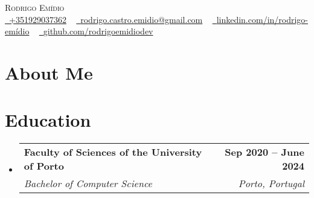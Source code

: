 \documentclass[letterpaper,11pt]{article}
\makeatletter
\newcommand{\resumeSubheading}[4]{
  \vspace{-2pt}\item
    \begin{tabular*}{1.0\textwidth}[t]{l@{\extracolsep{\fill}}r}
      \textbf{#1} & \textbf{\small #2} \\
      \textit{\small#3} & \textit{\small #4} \\
    \end{tabular*}\vspace{-7pt}
}
\newcommand{\resumeSubHeadingListStart}{\begin{itemize}[leftmargin=0.0in, label={}]}
\newcommand{\resumeSubHeadingListEnd}{\end{itemize}}
\makeatother
\begin{document}

\begin{center}
    {\Huge \scshape Rodrigo Emídio} \\ \vspace{5pt}
    \small \href{tel:+351929037362}{\raisebox{-0.1\height}\faPhone\ {+351929037362}} ~ \href{mailto:rodrigo.castro.emidio@gmail.com}{\raisebox{-0.2\height}\faEnvelope\ {rodrigo.castro.emidio@gmail.com}} ~ 
    \href{https://www.linkedin.com/in/rodrigo-emídio/}{\raisebox{-0.2\height}\faLinkedin\ {linkedin.com/in/rodrigo-emídio}}  ~
    \href{https://github.com/rodrigoemidiodev}{\raisebox{-0.2\height}\faGithub\ {github.com/rodrigoemidiodev}}
    \vspace{-8pt}
\end{center}

\section{About Me}

\section{Education}
  \resumeSubHeadingListStart
    \resumeSubheading
      {Faculty of Sciences of the University of Porto}{Sep 2020 -- June 2024}
      {Bachelor of Computer Science}{Porto, Portugal}
  \resumeSubHeadingListEnd

\end{document}
